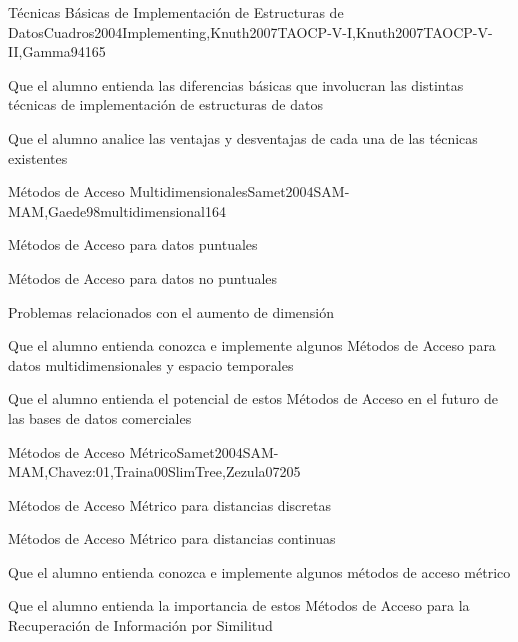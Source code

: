 \begin{syllabus}
\begin{unit}{Técnicas Básicas de Implementación de Estructuras de Datos}{Cuadros2004Implementing,Knuth2007TAOCP-V-I,Knuth2007TAOCP-V-II,Gamma94}{16}{5}
   \begin{learningoutcomes}
         \item Que el alumno entienda las diferencias básicas que involucran las distintas técnicas de implementación de estructuras de datos
         \item Que el alumno analice las ventajas y desventajas de cada una de las técnicas existentes
   \end{learningoutcomes}
\end{unit}

\begin{unit}{Métodos de Acceso Multidimensionales}{Samet2004SAM-MAM,Gaede98multidimensional}{16}{4}
   \begin{topics}
         \item Métodos de Acceso para datos puntuales
         \item Métodos de Acceso para datos no puntuales
         \item Problemas relacionados con el aumento de dimensión
   \end{topics}

   \begin{learningoutcomes}
         \item Que el alumno entienda conozca e implemente algunos Métodos de Acceso para datos multidimensionales y espacio temporales
         \item Que el alumno entienda el potencial de estos Métodos de Acceso en el futuro de las bases de datos comerciales
   \end{learningoutcomes}
\end{unit}

\begin{unit}{Métodos de Acceso Métrico}{Samet2004SAM-MAM,Chavez:01,Traina00SlimTree,Zezula07}{20}{5}
   \begin{topics}
         \item Métodos de Acceso Métrico para distancias discretas
         \item Métodos de Acceso Métrico para distancias continuas
   \end{topics}

   \begin{learningoutcomes}
         \item Que el alumno entienda conozca e implemente algunos métodos de acceso métrico
         \item Que el alumno entienda la importancia de estos Métodos de Acceso para la Recuperación de Información por Similitud
   \end{learningoutcomes}
\end{unit}


\end{syllabus}
